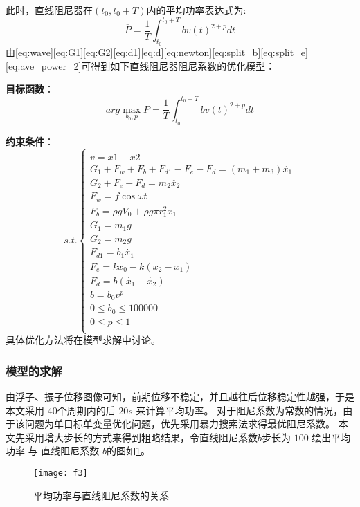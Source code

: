 \documentclass[withoutpreface,bwprint]{cumcmthesis} %
\begin{document}
    此时，直线阻尼器在$(t_0, t_0 + T)$内的平均功率表达式为:
    \begin{equation}
        \overline{P} = \frac{1}{T}\int_{t_0}^{t_0 + T}bv(t)^{2+p} dt
        \label{eq:ave_power_2}
    \end{equation}
    由\cref{eq:wave}\cref{eq:G1}\cref{eq:G2}\cref{eq:d1}\cref{eq:d}\cref{eq:newton}\cref{eq:split_b}\cref{eq:split_e}\cref{eq:ave_power_2}可得到如下直线阻尼器阻尼系数的优化模型：

    \textbf{目标函数}：
    \begin{equation}
        arg \max_{b_0, p} \overline{P} = \frac{1}{T}\int_{t_0}^{t_0 + T}bv(t)^{2+p} dt
        \label{eq:target_2}
    \end{equation}

    \textbf{约束条件}：
    \begin{equation}
        s.t.
        \begin{cases}
            v = \dot{x1} - \dot{x2}\\
            G_1 + F_w + F_b + F_{d1} - F_e - F_d = (m_1 + m_3) \ddot{x_1}\\
            G_2 + F_e + F_d = m_2 \ddot{x_2}\\
            F_w = f \cos\omega t \\
            F_b = \rho g V_0 + \rho g \pi r_1^2 x_1\\
            G_1 = m_1 g\\
            G_2 = m_2 g\\
            F_{d1} = b_1\dot{x_1}\\
            F_e = k x_0 - k(x_2 - x_1)\\
            F_d = b(\dot{x_1} - \dot{x_2})\\
            b = b_0 v^p\\
            0 \leq b_0 \leq 100000 \\
            0 \leq p \leq 1\\
        \end{cases}
        \label{eq:control_2}
    \end{equation}
    具体优化方法将在模型求解中讨论。
    \subsubsection{模型的求解}
    由浮子、振子位移图像可知，前期位移不稳定，并且越往后位移稳定性越强，于是本文采用 $40$个周期内的后 $20s$ 来计算平均功率。 
    对于阻尼系数为常数的情况，由于该问题为单目标单变量优化问题，优先采用暴力搜索法求得最优阻尼系数。
    本文先采用增大步长的方式来得到粗略结果，令直线阻尼系数$b$步长为 $100$ 绘出平均功率 与 直线阻尼系数 $b$的图如\cref{fig:power_b}。
    \begin{figure}[!htbp]
        \centering
        \texttt{[image: f3]}
        \caption{平均功率与直线阻尼系数的关系}
        \label{fig:power_b}
    \end{figure}
    
\end{document}

